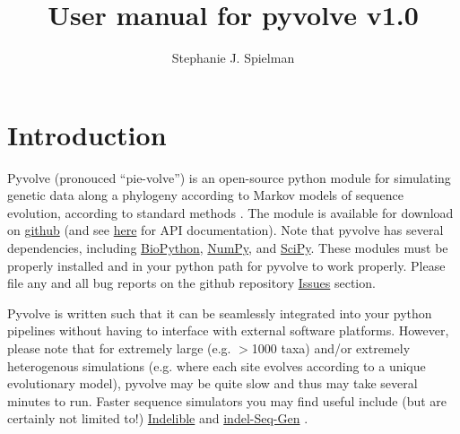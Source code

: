 \documentclass{article}
\begin{document}
\title{User manual for pyvolve v1.0}
\author{Stephanie J. Spielman}
\date{}
\maketitle

\tableofcontents

\section{Introduction}

Pyvolve (pronouced ``pie-volve'') is an open-source python module for simulating genetic data along a phylogeny according to Markov models of sequence evolution, according to standard methods \cite{Yang2006}. The module is available for download on \href{https://github.com/sjspielman/pyvolve/releases}{github} (and see \href{http://sjspielman.org/pyvolve/}{here} for API documentation). Note that pyvolve has several dependencies, including \href{http://biopython.org/wiki/Download}{BioPython}, \href{http://www.scipy.org/install.html}{NumPy}, and \href{http://www.scipy.org/install.html}{SciPy}. These modules must be properly installed and in your python path for pyvolve to work properly. Please file any and all bug reports on the github repository \href{https://github.com/sjspielman/pyvolve/issues}{Issues} section.

Pyvolve is written such that it can be seamlessly integrated into your python pipelines without having to interface with external software platforms. However, please note that for extremely large (e.g. $>$1000 taxa) and/or extremely heterogenous simulations (e.g. where each site evolves according to a unique evolutionary model), pyvolve may be quite slow and thus may take several minutes to run. Faster sequence simulators you may find useful include (but are certainly not limited to!) \href{http://abacus.gene.ucl.ac.uk/software/indelible/}{Indelible} \cite{Fletcher2009} and  \href{http://bioinfolab.unl.edu/~cstrope/iSG/}{indel-Seq-Gen} \cite{Strope2007}. 
\end{document}
